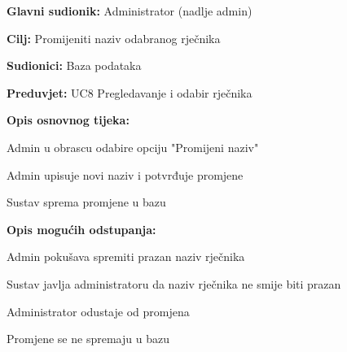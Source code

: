 \noindent {}
\begin{packed_item}

	\item \textbf{Glavni sudionik: } Administrator (nadlje admin)
	\item \textbf{Cilj: } Promijeniti naziv odabranog rječnika
	\item \textbf{Sudionici: } Baza podataka
	\item \textbf{Preduvjet: } UC8 Pregledavanje i odabir rječnika
	\item  \textbf{Opis osnovnog tijeka:}
	
	\item[] \begin{packed_enum}
		
		\item Admin u obrascu odabire opciju "Promijeni naziv"
		\item Admin upisuje novi naziv i potvrđuje promjene
		\item Sustav sprema promjene u bazu

	\end{packed_enum}

	\item  \textbf{Opis mogućih odstupanja:}
	
	\item[] \begin{packed_item}

		\item[2.a] Admin pokušava spremiti prazan naziv rječnika
		\item[] \begin{packed_enum}
			
			\item Sustav javlja administratoru da naziv rječnika ne smije biti prazan
			
		\end{packed_enum}

		\item[2.b] Administrator odustaje od promjena
		\item[] \begin{packed_enum}
			
			\item Promjene se ne spremaju u bazu
			
		\end{packed_enum}
		
	\end{packed_item}

\end{packed_item}


